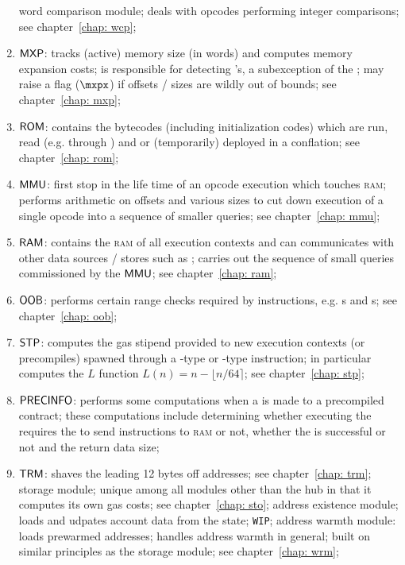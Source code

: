 \begin{enumerate}
		word comparison module;
		deals with opcodes performing integer comparisons;
		see chapter~\ref{chap: wcp};
	\item $\textsf{MXP}{}$:
		tracks (active) memory size (in \evm{} words) and computes memory expansion costs;
		is responsible for detecting \mxpxSH{}'s, a subexception of the \oogxSH{};
		may raise a flag ($\mxpx$) if offsets / sizes are wildly out of bounds;
		see chapter~\ref{chap: mxp};
	\item $\textsf{ROM}{}$:
		contains the bytecodes (including initialization codes) which are run, read (e.g. through ) and or (temporarily) deployed in a conflation;
		see chapter~\ref{chap: rom};
	\item $\textsf{MMU}{}$:
		first stop in the life time of an opcode execution which touches \textsc{ram};
		performs arithmetic on offsets and various sizes to cut down execution of a single opcode into a sequence of smaller queries;
		see chapter~\ref{chap: mmu};
	\item $\textsf{RAM}{}$:
		contains the \textsc{ram} of all execution contexts and can communicates with other data sources / stores such as \romMod{};
		carries out the sequence of small queries commissioned by the $\textsf{MMU}{}$;
		see chapter~\ref{chap: ram};
	\item $\textsf{OOB}{}$:
		performs certain range checks required by instructions, e.g. s and s;
		see chapter~\ref{chap: oob};
	\item $\textsf{STP}$:
		computes the gas stipend provided to new execution contexts (or precompiles) spawned through a -type or -type instruction;
		in particular computes the $L$ function $L(n) = n - \lfloor n/64 \rceil$; 
		see chapter~\ref{chap: stp};
	\item $\textsf{PRECINFO}$:
		performs some computations when a  is made to a precompiled contract;
		these computations include determining whether executing the  requires the \hubMod{} to send instructions to \textsc{ram} or not, whether the  is successful or not and the return data size; 
	\item $\textsf{TRM}{}$:
		shaves the leading 12 bytes off addresses; see chapter~\ref{chap: trm};
		storage module; unique among all modules other than the hub in that it computes its own gas costs; see chapter~\ref{chap: sto};
		address existence module; loads and udpates account data from the state; \texttt{WIP};
		address warmth module: loads prewarmed addresses; handles address warmth in general; built on similar principles as the storage module; see chapter~\ref{chap: wrm};
\end{enumerate}
